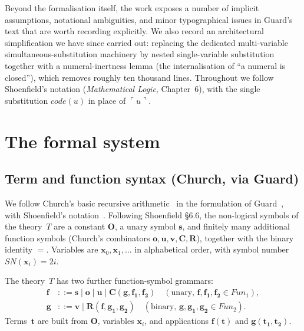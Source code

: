 \documentclass[11pt]{article}
\theoremstyle{plain}
\theoremstyle{definition}
\theoremstyle{remark}
\newcommand{\code}[1]{\mathit{code}(#1)}
\newcommand{\Fun}{\mathit{Fun}}
\newcommand{\SN}{\mathit{SN}}
\begin{document}

\newpage


Beyond the formalisation itself, the work
exposes a number of implicit assumptions, notational ambiguities, and
minor typographical issues in Guard's text that are worth recording
explicitly.  We also record an architectural simplification we have since
carried out: replacing the dedicated multi-variable simultaneous-substitution
machinery by nested single-variable substitution together with a
numeral-inertness lemma (the internalisation of ``a numeral is closed''),
which removes roughly ten thousand lines.  Throughout we follow Shoenfield's notation
(\emph{Mathematical Logic}, Chapter~6), with the single substitution
$\code{u}$ in place of $\ulcorner u \urcorner$.



\section{The formal system}



\subsection{Term and function syntax (Church, via Guard)}

We follow Church's basic recursive arithmetic~\cite{Church} in the
formulation of Guard~\cite{Guard63}, with Shoenfield's
notation~\cite{Shoenfield}.  Following Shoenfield {\S}6.6, the
non-logical symbols of the theory~$T$
are a constant $\mathbf{O}$, a unary symbol $\mathbf{s}$, and finitely
many additional function symbols (Church's combinators
$\mathbf{o},\mathbf{u},\mathbf{v},\mathbf{C},\mathbf{R}$), together with
the binary identity $=$.  Variables are $\mathbf{x}_0, \mathbf{x}_1,
\ldots$ in alphabetical order, with symbol number
$\SN(\mathbf{x}_i) = 2i$.

The theory~$T$ has two further function-symbol grammars:
\begin{align*}
\mathbf{f}   &::= \mathbf{s} \mid \mathbf{o} \mid \mathbf{u} \mid \mathbf{C}(\mathbf{g}, \mathbf{f_1}, \mathbf{f_2}) \quad (\text{unary, } \mathbf{f}, \mathbf{f_1}, \mathbf{f_2} \in \Fun_1), \\
\mathbf{g}   &::= \mathbf{v} \mid \mathbf{R}(\mathbf{f}, \mathbf{g_1}, \mathbf{g_2}) \quad (\text{binary, } \mathbf{g}, \mathbf{g_1}, \mathbf{g_2} \in \Fun_2).
\end{align*}
Terms~$\mathbf{t}$ are built from $\mathbf{O}$, variables
$\mathbf{x}_i$, and applications $\mathbf{f}(\mathbf{t})$ and
$\mathbf{g}(\mathbf{t_1}, \mathbf{t_2})$.
\end{document}

